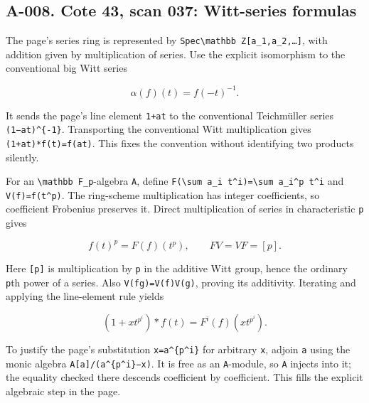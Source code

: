 \documentclass[
  10pt,
]{article}
\begin{document}
\subsection{A-008. Cote 43, scan 037: Witt-series
formulas}\label{a-008.-cote-43-scan-037-witt-series-formulas}

The page's series ring is represented by
\texttt{\small Spec\textbackslash{}mathbb Z[\allowbreak{}a\_\allowbreak{}1,\allowbreak{}a\_\allowbreak{}2,\allowbreak{}…]\allowbreak{}},
with addition given by multiplication of series. Use the explicit
isomorphism to the conventional big Witt series

\[
\alpha(f)(t)=f(-t)^{-1}.
\]

It sends the page's line element \texttt{\small 1+\allowbreak{}at} to
the conventional Teichmüller series
\texttt{\small (\allowbreak{}1−at)\allowbreak{}\textasciicircum{}\{-\allowbreak{}1\}}.
Transporting the conventional Witt multiplication gives
\texttt{\small (\allowbreak{}1+\allowbreak{}at)\allowbreak{}*f(\allowbreak{}t)\allowbreak{}=\allowbreak{}f(\allowbreak{}at)\allowbreak{}}.
This fixes the convention without identifying two products silently.

For an \texttt{\small \textbackslash{}mathbb F\_\allowbreak{}p}-algebra
\texttt{\small A}, define
\texttt{\small F(\allowbreak{}\textbackslash{}sum a\_\allowbreak{}i t\textasciicircum{}i)\allowbreak{}=\allowbreak{}\textbackslash{}sum a\_\allowbreak{}i\textasciicircum{}p t\textasciicircum{}i}
and
\texttt{\small V(\allowbreak{}f)\allowbreak{}=\allowbreak{}f(\allowbreak{}t\textasciicircum{}p)\allowbreak{}}.
The ring-scheme multiplication has integer coefficients, so coefficient
Frobenius preserves it. Direct multiplication of series in
characteristic \texttt{\small p} gives

\[
f(t)^p=F(f)(t^p),\qquad FV=VF=[p].
\]

Here \texttt{\small [\allowbreak{}p]\allowbreak{}} is multiplication by
\texttt{\small p} in the additive Witt group, hence the ordinary
\texttt{\small p}th power of a series. Also
\texttt{\small V(\allowbreak{}fg)\allowbreak{}=\allowbreak{}V(\allowbreak{}f)\allowbreak{}V(\allowbreak{}g)\allowbreak{}},
proving its additivity. Iterating and applying the line-element rule
yields

\[
(1+x t^{p^i})*f(t)=F^i(f)(x t^{p^i}).
\]

To justify the page's substitution
\texttt{\small x=\allowbreak{}a\textasciicircum{}\{p\textasciicircum{}i\}}
for arbitrary \texttt{\small x}, adjoin \texttt{\small a} using the
monic algebra
\texttt{\small A[\allowbreak{}a]\allowbreak{}/\allowbreak{}(\allowbreak{}a\textasciicircum{}\{p\textasciicircum{}i\}−x)\allowbreak{}}.
It is free as an \texttt{\small A}-module, so \texttt{\small A} injects
into it; the equality checked there descends coefficient by coefficient.
This fills the explicit algebraic step in the page.
\end{document}
